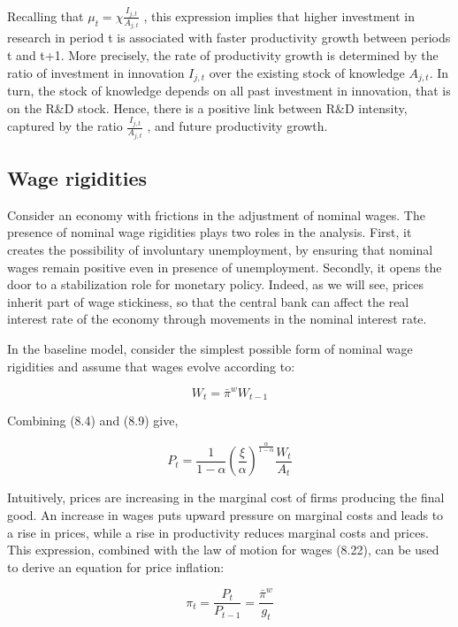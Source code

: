 \documentclass[cn,10pt,math=newtx,citestyle=gb7714-2015,bibstyle=gb7714-2015]{elegantbook}
\begin{document}
{{Recalling that $\mu_t =\chi \frac{I_{j,t}}{A_{j,t}}$ , this expression implies that higher investment in research in period t is associated with faster productivity growth between periods t and t+1. More precisely, the rate of productivity growth is determined by the ratio of investment in innovation $I_{j,t}$ over the existing stock of knowledge $A_{j,t} $. In turn, the stock of knowledge depends on all past investment in innovation, that is on the R\&D stock. Hence, there is a positive link between R\&D intensity, captured by the ratio $\frac{I_{j,t}}{A_{j,t}}$ , and future productivity growth.
	
	\subsection{Wage rigidities}
	
 Consider an economy with frictions in the adjustment of nominal wages. The presence of nominal wage rigidities plays two roles in the analysis. First, it creates the possibility of involuntary unemployment, by ensuring that nominal wages remain positive even in presence of unemployment. Secondly, it opens the door to a stabilization role for monetary policy. Indeed, as we will see, prices inherit part of wage stickiness, so that the central bank can affect the real interest rate of the economy through movements in the nominal interest rate.
	
	In the baseline model, consider the simplest possible form of nominal wage rigidities and assume that wages evolve according to:
	
	\begin{equation}
		W_t = \bar{\pi}^w W_{t-1}
	\end{equation}

Combining (8.4) and (8.9) give, 

\begin{equation}
	P_t = \frac{1}{1-\alpha}\left(\frac{\xi}{\alpha}\right)^{\frac{\alpha}{1-\alpha}}\frac{W_t}{A_t}
\end{equation}
	
Intuitively, prices are increasing in the marginal cost of firms producing the final good. An increase in wages puts upward pressure on marginal costs and leads to a rise in prices, while a rise in productivity reduces marginal costs and prices. This expression, combined with the law of motion for wages (8.22), can be used to derive an equation for price inflation:	
	
	\begin{equation}
		\pi_t = \frac{P_t}{P_{t-1}} = \frac{\bar{\pi}^w}{g_t}
	\end{equation}
	
}}
\end{document}
